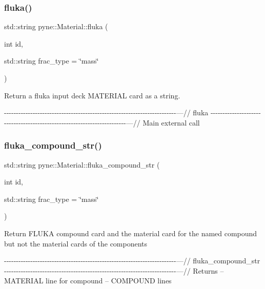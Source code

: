 \subsubsection{\texorpdfstring{fluka()}{fluka()}}
{\footnotesize\ttfamily std\+::string pyne\+::\+Material\+::fluka (\begin{DoxyParamCaption}\item[{int}]{id,  }\item[{std\+::string}]{frac\+\_\+type = {\ttfamily \char`\"{}mass\char`\"{}} }\end{DoxyParamCaption})}



Return a fluka input deck M\+A\+T\+E\+R\+I\+AL card as a string. 

-\/-\/-\/-\/-\/-\/-\/-\/-\/-\/-\/-\/-\/-\/-\/-\/-\/-\/-\/-\/-\/-\/-\/-\/-\/-\/-\/-\/-\/-\/-\/-\/-\/-\/-\/-\/-\/-\/-\/-\/-\/-\/-\/-\/-\/-\/-\/-\/-\/-\/-\/-\/-\/-\/-\/-\/-\/-\/-\/-\/-\/-\/-\/-\/-\/-\/-\/-\/-\/-\/-\/-\/---// fluka -\/-\/-\/-\/-\/-\/-\/-\/-\/-\/-\/-\/-\/-\/-\/-\/-\/-\/-\/-\/-\/-\/-\/-\/-\/-\/-\/-\/-\/-\/-\/-\/-\/-\/-\/-\/-\/-\/-\/-\/-\/-\/-\/-\/-\/-\/-\/-\/-\/-\/-\/-\/-\/-\/-\/-\/-\/-\/-\/-\/-\/-\/-\/-\/-\/-\/-\/-\/-\/-\/-\/-\/---// Main external call \mbox{\label{classpyne_1_1_material_a3dd223f881e39c1c6014c2b79c9ee39b}} 
\subsubsection{\texorpdfstring{fluka\+\_\+compound\+\_\+str()}{fluka\_compound\_str()}}
{\footnotesize\ttfamily std\+::string pyne\+::\+Material\+::fluka\+\_\+compound\+\_\+str (\begin{DoxyParamCaption}\item[{int}]{id,  }\item[{std\+::string}]{frac\+\_\+type = {\ttfamily \char`\"{}mass\char`\"{}} }\end{DoxyParamCaption})}

Return F\+L\+U\+KA compound card and the material card for the named compound but not the material cards of the components

-\/-\/-\/-\/-\/-\/-\/-\/-\/-\/-\/-\/-\/-\/-\/-\/-\/-\/-\/-\/-\/-\/-\/-\/-\/-\/-\/-\/-\/-\/-\/-\/-\/-\/-\/-\/-\/-\/-\/-\/-\/-\/-\/-\/-\/-\/-\/-\/-\/-\/-\/-\/-\/-\/-\/-\/-\/-\/-\/-\/-\/-\/-\/-\/-\/-\/-\/-\/-\/-\/-\/-\/---// fluka\+\_\+compound\+\_\+str -\/-\/-\/-\/-\/-\/-\/-\/-\/-\/-\/-\/-\/-\/-\/-\/-\/-\/-\/-\/-\/-\/-\/-\/-\/-\/-\/-\/-\/-\/-\/-\/-\/-\/-\/-\/-\/-\/-\/-\/-\/-\/-\/-\/-\/-\/-\/-\/-\/-\/-\/-\/-\/-\/-\/-\/-\/-\/-\/-\/-\/-\/-\/-\/-\/-\/-\/-\/-\/-\/-\/-\/---// Returns -- M\+A\+T\+E\+R\+I\+AL line for compound -- C\+O\+M\+P\+O\+U\+ND lines \mbox{\label{classpyne_1_1_material_ab5fb8d5171b210a7c151d6bb1e180693}} 
